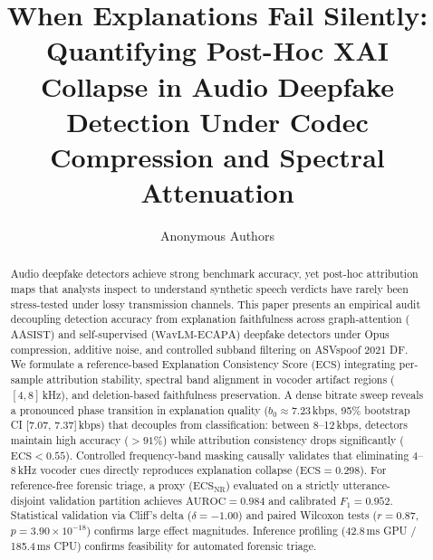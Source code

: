 \documentclass[runningheads]{llncs}
\newcommand{\ecs}{\ensuremath{\mathrm{ECS}}}
\newcommand{\ecsnr}{\ensuremath{\mathrm{ECS}_{\mathrm{NR}}}}
\newcommand{\aasist}{\ensuremath{\mathrm{AASIST}}}
\newcommand{\wavlm}{\ensuremath{\mathrm{WavLM}\text{-}\mathrm{ECAPA}}}
\begin{document}
\title{When Explanations Fail Silently: Quantifying Post-Hoc XAI Collapse in Audio Deepfake Detection Under Codec Compression and Spectral Attenuation}


\author{Anonymous Authors}


\maketitle

\begin{abstract}
Audio deepfake detectors achieve strong benchmark accuracy, yet post-hoc attribution maps that analysts inspect to understand synthetic speech verdicts have rarely been stress-tested under lossy transmission channels.
This paper presents an empirical audit decoupling detection accuracy from explanation faithfulness across graph-attention (\aasist{}) and self-supervised (\wavlm{}) deepfake detectors under Opus compression, additive noise, and controlled subband filtering on ASVspoof 2021 DF.
We formulate a reference-based Explanation Consistency Score (\ecs{}) integrating per-sample attribution stability, spectral band alignment in vocoder artifact regions ($[4, 8]$\,kHz), and deletion-based faithfulness preservation.
A dense bitrate sweep reveals a pronounced phase transition in explanation quality ($b_0 \approx 7.23$\,kbps, 95\% bootstrap CI [7.07, 7.37]\,kbps) that decouples from classification: between 8--12\,kbps, detectors maintain high accuracy ($>91\%$) while attribution consistency drops significantly ($\ecs < 0.55$).
Controlled frequency-band masking causally validates that eliminating $4$--$8$\,kHz vocoder cues directly reproduces explanation collapse ($\ecs = 0.298$).
For reference-free forensic triage, a proxy (\ecsnr{}) evaluated on a strictly utterance-disjoint validation partition achieves $\text{AUROC} = 0.984$ and calibrated $F_1 = 0.952$.
Statistical validation via Cliff's delta ($\delta = -1.00$) and paired Wilcoxon tests ($r = 0.87$, $p = 3.90 \times 10^{-18}$) confirms large effect magnitudes.
Inference profiling (42.8\,ms GPU / 185.4\,ms CPU) confirms feasibility for automated forensic triage.
\end{abstract}

\end{document}
